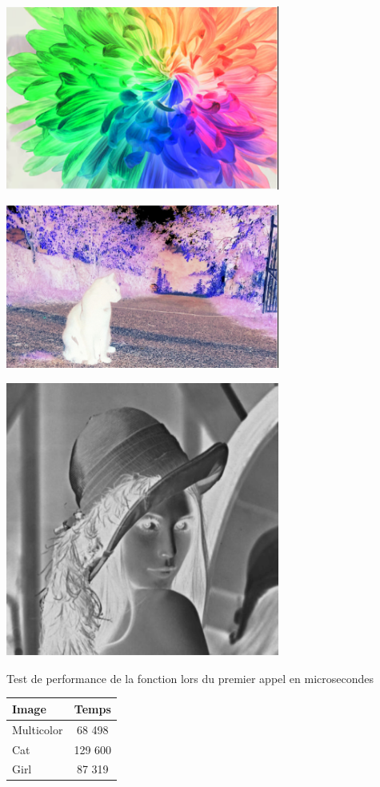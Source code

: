 \documentclass{article}
\begin{document}
\begin{center} 
    \includegraphics[width=9cm]{../Image_fonctions/Multicolor/NegativeRS.PNG}
\end{center}
\begin{center} 
    \includegraphics[width=9cm]{../Image_fonctions/Cat/NegativeRS.PNG}
\end{center}
\begin{center} 
    \includegraphics[width=9cm]{../Image_fonctions/Lenna/NegativeRS.PNG}
\end{center}

\begin{center}
\medbreak
Test de performance de la fonction lors du premier appel en microsecondes
\bigbreak
   \begin{tabular}{ | l | c | }
     \hline
     Image & Temps \\
     \hline
     Multicolor & 68 498 \\
     \hline
     Cat & 129 600 \\
     \hline
     Girl & 87 319 \\
     \hline
   \end{tabular}
 \end{center}
\bigbreak
\end{document}

